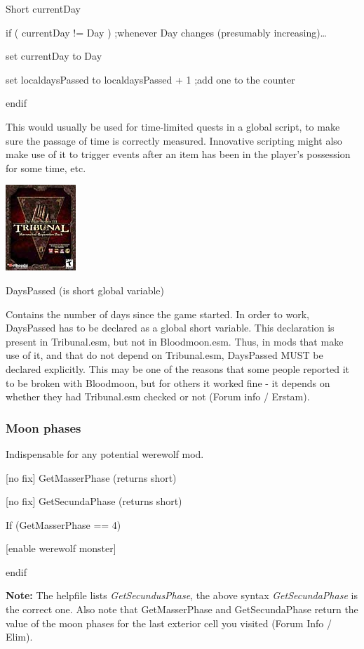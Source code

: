 \documentclass[
]{article}
\begin{document}
Short currentDay

if ( currentDay != Day ) ;whenever Day changes (presumably
increasing)\ldots{}

set currentDay to Day

set localdaysPassed to localdaysPassed + 1 ;add one to the counter

endif

This would usually be used for time-limited quests in a global script,
to make sure the passage of time is correctly measured. Innovative
scripting might also make use of it to trigger events after an item has
been in the player's possession for some time, etc.

\includegraphics{media/image6.png}

DaysPassed (is short global variable)

Contains the number of days since the game started. In order to work,
DaysPassed has to be declared as a global short variable. This
declaration is present in Tribunal.esm, but not in Bloodmoon.esm. Thus,
in mods that make use of it, and that do not depend on Tribunal.esm,
DaysPassed MUST be declared explicitly. This may be one of the reasons
that some people reported it to be broken with Bloodmoon, but for others
it worked fine - it depends on whether they had Tribunal.esm checked or
not (Forum info / Erstam).

\hypertarget{moon-phases}{%
\subsubsection{Moon phases}\label{moon-phases}}

Indispensable for any potential werewolf mod.

{[}no fix{]} GetMasserPhase (returns short)

{[}no fix{]} GetSecundaPhase (returns short)

If (GetMasserPhase == 4)

{[}enable werewolf monster{]}

endif

\textbf{Note:} The helpfile lists \emph{GetSecundusPhase}, the above
syntax \emph{GetSecundaPhase} is the correct one. Also note that
GetMasserPhase and GetSecundaPhase return the value of the moon phases
for the last exterior cell you visited (Forum Info / Elim).
\end{document}

